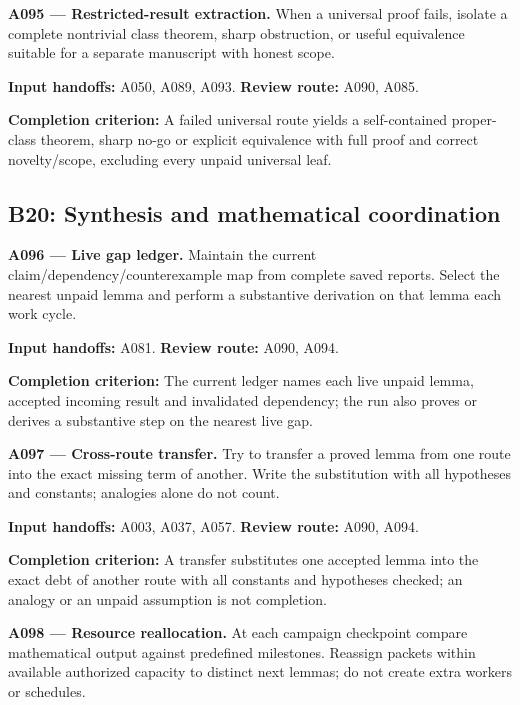 \documentclass[11pt]{article}
\begin{document}
\textbf{A095 --- Restricted-result extraction.} When a universal proof fails, isolate a complete nontrivial class theorem, sharp obstruction, or useful equivalence suitable for a separate manuscript with honest scope.

{\small\color{ink}\textbf{Input handoffs:} A050, A089, A093. \textbf{Review route:} A090, A085.\par
\textbf{Completion criterion:} A failed universal route yields a self-contained proper-class theorem, sharp no-go or explicit equivalence with full proof and correct novelty/scope, excluding every unpaid universal leaf.\par}



\subsection{B20: Synthesis and mathematical coordination}

\textbf{A096 --- Live gap ledger.} Maintain the current claim/dependency/counterexample map from complete saved reports. Select the nearest unpaid lemma and perform a substantive derivation on that lemma each work cycle.

{\small\color{ink}\textbf{Input handoffs:} A081. \textbf{Review route:} A090, A094.\par
\textbf{Completion criterion:} The current ledger names each live unpaid lemma, accepted incoming result and invalidated dependency; the run also proves or derives a substantive step on the nearest live gap.\par}



\textbf{A097 --- Cross-route transfer.} Try to transfer a proved lemma from one route into the exact missing term of another. Write the substitution with all hypotheses and constants; analogies alone do not count.

{\small\color{ink}\textbf{Input handoffs:} A003, A037, A057. \textbf{Review route:} A090, A094.\par
\textbf{Completion criterion:} A transfer substitutes one accepted lemma into the exact debt of another route with all constants and hypotheses checked; an analogy or an unpaid assumption is not completion.\par}



\textbf{A098 --- Resource reallocation.} At each campaign checkpoint compare mathematical output against predefined milestones. Reassign packets within available authorized capacity to distinct next lemmas; do not create extra workers or schedules.
\end{document}
